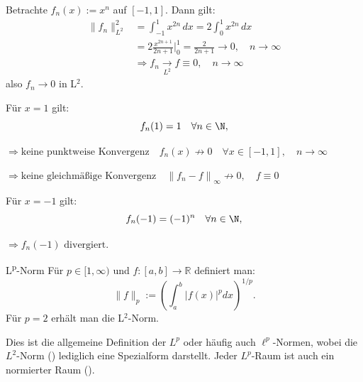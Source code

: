 \begin{beispielbox}
    Betrachte $f_n(x) := x^n$ auf $[-1,1]$. Dann gilt:
    $$
    \begin{aligned}
        \|f_n\|_{L^2}^2 
        &= \int_{-1}^{1} x^{2n} \, dx 
        = 2 \int_0^1 x^{2n} \, dx \\ 
        &= 2 \frac{x^{2n+1}}{2n+1} \Bigg|_0^1 
        = \frac{2}{2n+1} \longrightarrow 0, \quad n \to \infty \\ 
        &\Rightarrow f_n \underset{L^2}\to f \equiv 0, \quad n \to \infty
    \end{aligned}
    $$
    also $f_n \to 0$ in L$^2$.
    

    Für $x=1$ gilt:
    $$
        f_n(1) = 1 \quad \forall n \in \N,
    $$

    $
        \Rightarrow \text{keine punktweise Konvergenz} \quad f_n(x) \not\to 0 \quad \forall x\in [-1,1], \quad n \to \infty
    $

    $
        \Rightarrow \text{keine gleichmäßige Konvergenz} \quad \left\| f_n - f \right\|_\infty \not \to  0, \quad f\equiv 0
    $

    Für $x=-1$ gilt:
    $$
        f_n(-1) = (-1)^n \quad \forall n \in \N,
    $$

    $
        \Rightarrow f_n(-1) \text{ divergiert.}
    $
\end{beispielbox}

\begin{definition}[deflabel=LpNorm]{L\textsuperscript{p}-Norm}
    Für $p \in [1,\infty)$ und $f : [a,b] \to \mathbb{R}$ definiert man:
    $$
        \|f\|_p := \left( \int_a^b |f(x)|^pdx \right)^{1/p}.
    $$
    Für $p=2$ erhält man die L$^2$-Norm.
\end{definition}
Dies ist die allgemeine Definition der $L^p$ oder häufig auch $\ell^p$-Normen, wobei die $L^2$-Norm () lediglich eine Spezialform darstellt.
Jeder $L^p$-Raum ist auch ein normierter Raum ().

